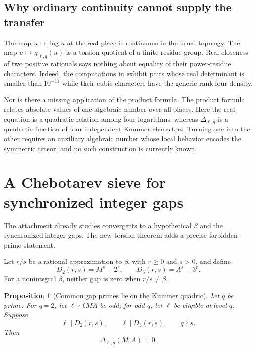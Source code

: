 \documentclass[11pt]{article}
\numberwithin{equation}{section}
\newtheorem{proposition}[theorem]{Proposition}
\theoremstyle{definition}
\theoremstyle{remark}
\begin{document}
\subsection{Why ordinary continuity cannot supply the transfer}

The map \(u\mapsto\log u\) at the real place is continuous in the usual topology.  The map
\(u\mapsto\chi_{\ell,q}(u)\) is a torsion quotient of a finite residue group.  Real closeness
of two positive rationals says nothing about equality of their power-residue characters.
Indeed, the computations in  exhibit pairs whose real determinant is
smaller than \(10^{-11}\) while their cubic characters have the generic rank-four density.

Nor is there a missing application of the product formula.  The product formula relates
absolute values of one algebraic number over all places.  Here the real equation is a
quadratic relation among four logarithms, whereas \(\Delta_{\ell,q}\) is a quadratic
function of four independent Kummer characters.  Turning one into the other requires an
auxiliary algebraic number whose local behavior encodes the symmetric tensor, and no such
construction is currently known.

\section{A Chebotarev sieve for synchronized integer gaps}
\label{sec:gapsieve}

The attachment already studies convergents to a hypothetical \(\beta\) and the synchronized
integer gaps.  The new torsion theorem adds a precise forbidden-prime statement.

Let \(r/s\) be a rational approximation to \(\beta\), with \(r\ge0\) and \(s>0\), and define
\begin{equation}
 D_2(r,s)=M^s-2^r,
 \qquad
 D_3(r,s)=A^s-3^r.\label{eq:gaps}
\end{equation}
For a nonintegral \(\beta\), neither gap is zero when \(r/s\ne\beta\).

\begin{proposition}[Common gap primes lie on the Kummer quadric]
\label{prop:gapprime}
Let \(q\) be prime.  For \(q=2\), let \(\ell\nmid6MA\) be odd; for odd \(q\), let
\(\ell\) be eligible at level \(q\).  Suppose
\[
 \ell\mid D_2(r,s),\qquad \ell\mid D_3(r,s),
 \qquad q\nmid s.
\]
Then
\begin{equation}
 \Delta_{\ell,q}(M,A)=0.\label{eq:gapdelta0}
\end{equation}
\end{proposition}
\end{document}
